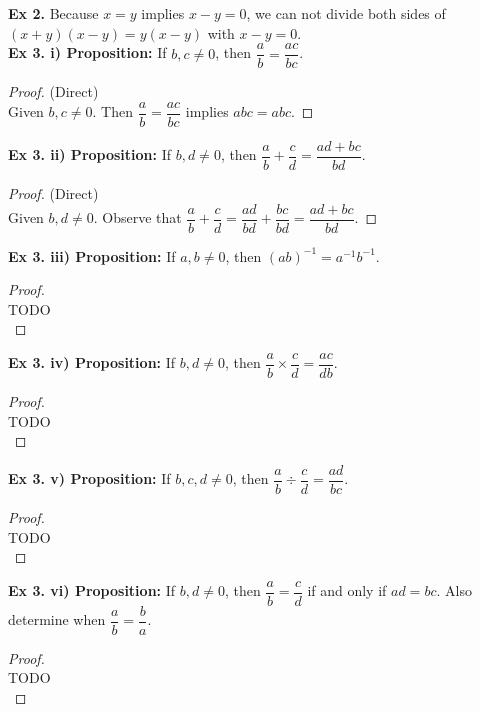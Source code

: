 \documentclass{article}
\begin{document}
	\textbf{Ex 2.} Because $x=y$ implies $x-y=0$, we can not divide both sides of $(x+y)(x-y)=y(x-y)$ with $x-y=0$.\\
	
	\textbf{Ex 3. i) Proposition:} If $b,c \not= 0$, then $\dfrac{a}{b}=\dfrac{ac}{bc}$.\\
	\begin{proof}
		(Direct)\\
		Given $b,c \not = 0$. Then $\dfrac{a}{b}=\dfrac{ac}{bc}$ implies $abc=abc$.
	\end{proof}

	\textbf{Ex 3. ii) Proposition:} If $b,d \not=0$, then $\dfrac{a}{b}+\dfrac{c}{d}=\dfrac{ad+bc}{bd}$.\\
	\begin{proof}
		(Direct)\\
		Given $b,d \not= 0$. Observe that $\dfrac{a}{b}+\dfrac{c}{d}=\dfrac{ad}{bd}+\dfrac{bc}{bd}=\dfrac{ad+bc}{bd}$.
	\end{proof}

	\textbf{Ex 3. iii) Proposition:} If $a,b \not=0$, then $(ab)^{-1}=a^{-1}b^{-1}$.\\
	\begin{proof}
		$ $\\
		TODO\\
	\end{proof}

	\textbf{Ex 3. iv) Proposition:} If $b,d \not=0$, then $\dfrac{a}{b} \times \dfrac{c}{d}=\dfrac{ac}{db}$.\\
	\begin{proof}
		$ $\\
		TODO\\
	\end{proof}

	\textbf{Ex 3. v) Proposition:} If $b,c,d \not=0$, then $\dfrac{a}{b} \div \dfrac{c}{d}=\dfrac{ad}{bc}$.\\
	\begin{proof}
		$ $\\
		TODO\\
	\end{proof}

	\textbf{Ex 3. vi) Proposition:} If $b,d \not=0$, then $\dfrac{a}{b} = \dfrac{c}{d}$ if and only if $ad=bc$. Also determine when $\dfrac{a}{b}=\dfrac{b}{a}$.\\
	\begin{proof}
		$ $\\
		TODO\\
	\end{proof}

	
\end{document}
